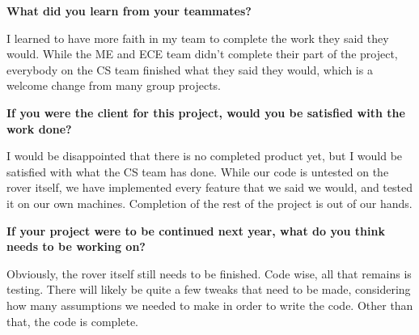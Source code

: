 \documentclass[10pt,letterpaper,onecolumn,draftclsnofoot,journal]{IEEEtran}
\begin{document}
\par
\textbf{What did you learn from your teammates?}\vspace{.3cm}
\par
I learned to have more faith in my team to complete the work they said they would. While the ME and ECE team didn't complete their part of the project, everybody on the CS team finished what they said they would, which is a welcome change from many group projects.\vspace{.3cm}
\par
\textbf{If you were the client for this project, would you be satisfied with the work done?}\vspace{.3cm}
\par
I would be disappointed that there is no completed product yet, but I would be satisfied with what the CS team has done. While our code is untested on the rover itself, we have implemented every feature that we said we would, and tested it on our own machines. Completion of the rest of the project is out of our hands.\vspace{.3cm}
\par
\textbf{If your project were to be continued next year, what do you think needs to be working on?}\vspace{.3cm}
\par
Obviously, the rover itself still needs to be finished. Code wise, all that remains is testing. There will likely be quite a few tweaks that need to be made, considering how many assumptions we needed to make in order to write the code. Other than that, the code is complete.
\end{document}
